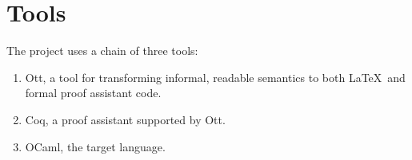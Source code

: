 \documentclass[12pt,twoside,notitlepage]{report}
\theoremstyle{plain}%
\theoremstyle{definition}
\theoremstyle{remark}
\begin{document}
%
%
%
%
%
%
%

\section{Tools}
The project uses a chain of three tools: \begin{enumerate}
\item{
Ott, a tool for transforming informal, readable semantics to both \LaTeX\, and formal proof assistant code.}
\item{Coq, a proof assistant supported by Ott. }
\item{OCaml, the target language. }
\end{enumerate}
\end{document}

